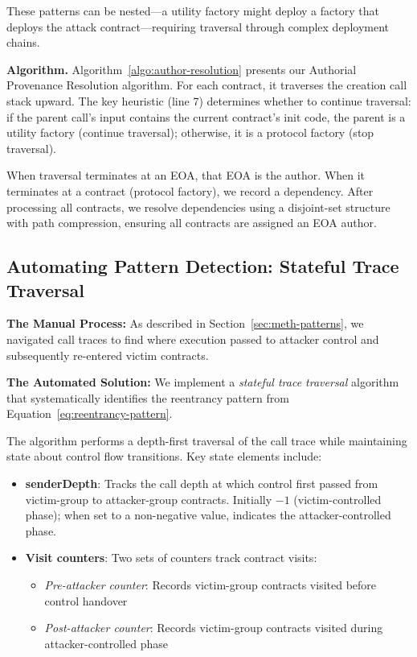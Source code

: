 These patterns can be nested---a utility factory might deploy a factory that deploys the attack contract---requiring traversal through complex deployment chains.

\textbf{Algorithm.} Algorithm~\ref{algo:author-resolution} presents our Authorial Provenance Resolution algorithm. For each contract, it traverses the creation call stack upward. The key heuristic (line 7) determines whether to continue traversal: if the parent call's input contains the current contract's init code, the parent is a utility factory (continue traversal); otherwise, it is a protocol factory (stop traversal).

When traversal terminates at an EOA, that EOA is the author. When it terminates at a contract (protocol factory), we record a dependency. After processing all contracts, we resolve dependencies using a disjoint-set structure with path compression, ensuring all contracts are assigned an EOA author.



\subsection{Automating Pattern Detection: Stateful Trace Traversal}
\label{sec:meth-detection}

\textbf{The Manual Process:} As described in Section~\ref{sec:meth-patterns}, we navigated call traces to find where execution passed to attacker control and subsequently re-entered victim contracts.

\textbf{The Automated Solution:} We implement a \textit{stateful trace traversal} algorithm that systematically identifies the reentrancy pattern from Equation~\ref{eq:reentrancy-pattern}.

The algorithm performs a depth-first traversal of the call trace while maintaining state about control flow transitions. Key state elements include:

\begin{itemize}
    \item \textbf{senderDepth}: Tracks the call depth at which control first passed from victim-group to attacker-group contracts. Initially $-1$ (victim-controlled phase); when set to a non-negative value, indicates the attacker-controlled phase.
    
    \item \textbf{Visit counters}: Two sets of counters track contract visits:
    \begin{itemize}
        \item \textit{Pre-attacker counter}: Records victim-group contracts visited before control handover
        \item \textit{Post-attacker counter}: Records victim-group contracts visited during attacker-controlled phase
    \end{itemize}
\end{itemize}

